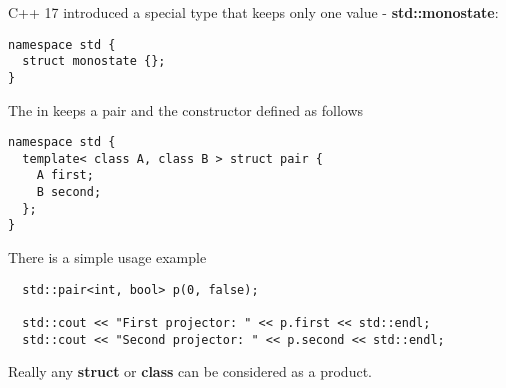 \begin{example}
\label{ex:cpp_terminal_object}
C++ 17 introduced a special type that keeps only one value -
\textbf{std::monostate}:  
\begin{verbatim}
namespace std {
  struct monostate {};
}
\end{verbatim}
\end{example}

\begin{example}[Product][$\cat{C++}$]
\label{ex:cpp_product}
The  in  keeps a
pair and the constructor defined as follows
\begin{verbatim}
namespace std {
  template< class A, class B > struct pair {
    A first;
    B second;
  };
}
\end{verbatim}

There is a simple usage example
\begin{verbatim}
  std::pair<int, bool> p(0, false);

  std::cout << "First projector: " << p.first << std::endl;
  std::cout << "Second projector: " << p.second << std::endl;

\end{verbatim}
Really any \textbf{struct} or \textbf{class} can be
considered as a product. 
\end{example}

